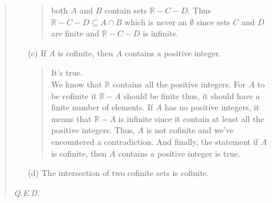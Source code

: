 \documentclass[12pt, a4paper]{article}                      %
\begin{document}
\begin{enumerate}
\begin{quote}
\begin{itemize}
\begin{quote}
both $A$ and $B$ contain sets $\mathbb{R} - C - D$. Thus $\mathbb{R} - C - D \subseteq A \cap B$
which is never an $\emptyset$ since sets $C$ and $D$ are finite and $\mathbb{R} - C - D$ is infinite.\\
\end{quote}
\item[(c)]
If $A$ is cofinite, then $A$ contains a positive integer.
\begin{quote}
It's true.\\
We know that $\mathbb{R}$ contains all the positive integers. For $A$
to be cofinite it $\mathbb{R} - A$ should be finite thus, it should
have a finite number of elements. If $A$ has no positive integers,
it means that $\mathbb{R} - A$ is infinite since it contain
at least all the positive integers. Thus, $A$ is not cofinite and
we've encountered a contradiction. And finally, the statement if
$A$ is cofinite, then $A$ contains a positive integer is true.
\end{quote}
\item[(d)]
The intersection of two cofinite sets is cofinite.
\begin{quote}

\end{quote}
\end{itemize}
\begin{flushright}
\textit{Q.E.D.}
\end{flushright}
\end{quote}


\end{enumerate}
\end{document}
